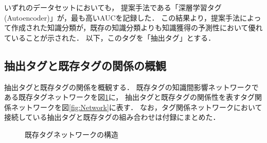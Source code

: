 いずれのデータセットにおいても，
提案手法である「深層学習タグ(Autoencoder)」が，最も高いAUCを記録した．
この結果より，提案手法によって作成された知識分類が，既存の知識分類よりも知識獲得の予測性において優れていることが示された．
以下，このタグを「抽出タグ」とする．


\subsection{抽出タグと既存タグの関係の概観}
抽出タグと既存タグの関係を概観する．
既存タグの知識間影響ネットワークである既存タグネットワークを図\ref{fig:SimpleNetwork}に，
抽出タグと既存タグの関係性を表すタグ関係ネットワークを図\ref{fig:Network}に表す．
なお，タグ関係ネットワークにおいて接続している抽出タグと既存タグの組み合わせは付録にまとめた．


\begin{figure}[H]
\begin{center}
\hspace*{-20pt}
\end{center}
\caption{既存タグネットワークの構造}
\label{fig:SimpleNetwork}
\end{figure}


